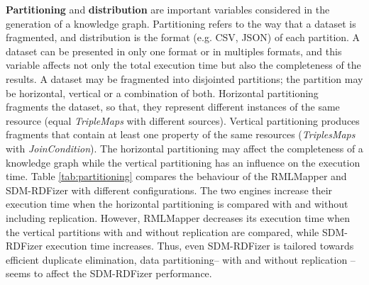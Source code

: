 \noindent \textbf{Partitioning} and \textbf{distribution} are important variables considered in the generation of a knowledge graph. Partitioning refers to the way that a dataset is fragmented, and distribution is the format (e.g. CSV, JSON) of each partition. A dataset can be presented in only one format or in multiples formats, and this variable affects not only the total execution time but also the completeness of the results. A dataset may be fragmented into disjointed partitions; the partition may be horizontal, vertical or a combination of both. Horizontal partitioning fragments the dataset, so that, they represent different instances of the same resource (equal \textit{TripleMaps} with different sources). Vertical partitioning produces fragments that contain at least one property of the same resources (\textit{TriplesMaps} with \textit{JoinCondition}). The horizontal partitioning may affect the completeness of a knowledge graph while the vertical partitioning has an influence on the execution time. Table \ref{tab:partitioning} compares the behaviour of the RMLMapper and SDM-RDFizer with different configurations. The two engines increase their execution time when the horizontal partitioning is compared with and without including replication. However, RMLMapper decreases its execution time when the vertical partitions with and without replication are compared, while SDM-RDFizer execution time increases.  Thus, even SDM-RDFizer is tailored towards efficient duplicate elimination, data partitioning-- with and without replication -- seems to affect the SDM-RDFizer performance. \newline

